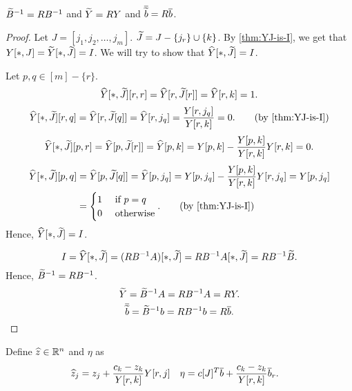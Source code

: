 \documentclass[a4paper, 12pt, fleqn]{article}
\newcommand*{\bline}{\overline{b}}
\newcommand*{\btildline}{\overline{\btild}}
\newenvironment*{longProof}{\begin{proof}}{\end{proof}}
\begin{document}
\begin{lemma}
\label{thm:upd-Y}
$\widetilde{B}^{-1} = RB^{-1}$ and $\widetilde{Y} = RY$ and $\btildline = R\bline$.
\end{lemma}
\begin{longProof}
Let $J = [j_1, j_2, \ldots, j_m]$. $\widetilde{J} = J - \{j_r\} \cup \{k\}$.
By \cref{thm:YJ-is-I}, we get that $Y[*,J] = \widetilde{Y}[*,\widetilde{J}] = I$.
We will try to show that $\widehat{Y}[*,\widetilde{J}] = I$.

Let $p, q \in [m] - \{r\}$.
\[ \widehat{Y}[*,\widetilde{J}][r,r] = \widehat{Y}[r,\widetilde{J}[r]] = \widehat{Y}[r,k] = 1. \]
\[ \Yhat[*,\Jtild][r,q] = \Yhat[r,\Jtild[q]] = \Yhat[r,j_q] = \frac{Y[r,j_q]}{Y[r,k]} = 0.
    \tag{by \cref{thm:YJ-is-I}} \]
\[ \widehat{Y}[*,\widetilde{J}][p,r] = \widehat{Y}[p,\widetilde{J}[r]] = \widehat{Y}[p,k]
    = Y[p,k] - \frac{Y[p,k]}{Y[r,k]}Y[r,k] = 0. \]
\begin{align*}
\Yhat[*,\Jtild][p,q] &= \Yhat[p,\Jtild[q]] = \Yhat[p,j_q]
= Y[p,j_q] - \frac{Y[p,k]}{Y[r,k]}Y[r,j_q] = Y[p,j_q]
\\ &= \begin{cases}1 & \textrm{ if } p = q \\ 0 & \textrm{ otherwise}\end{cases}.
\tag{by \cref{thm:YJ-is-I}}
\end{align*}
Hence, $\widehat{Y}[*,\widetilde{J}] = I$.

\[ I = \widehat{Y}[*,\widetilde{J}] = (RB^{-1}A)[*,\widetilde{J}] = RB^{-1}A[*,\widetilde{J}] = RB^{-1}\widetilde{B}. \]
Hence, $\widetilde{B}^{-1} = RB^{-1}$.
\[ \widetilde{Y} = \widetilde{B}^{-1}A = RB^{-1}A = RY. \]
\[ \btildline = \Btild^{-1}b = RB^{-1}b = R\bline. \qedhere \]
\end{longProof}

Define $\widehat{z} \in \mathbb{R}^n$ and $\eta$ as
\begin{align*}
\zhat_j &= z_j + \frac{c_k - z_k}{Y[r,k]} Y[r,j]
& \eta &= c[J]^T\bline + \frac{c_k - z_k}{Y[r, k]}\bline_r.
\end{align*}
\end{document}
